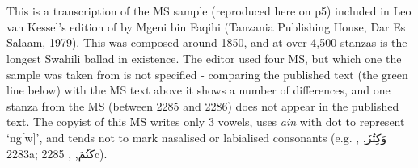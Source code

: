 \documentclass[a4paper, 12pt]{report}
\begin{document}
\begin{center}
 \\
 \\
\vspace{8mm}
\end{center}

\begin{small}
This is a transcription of the MS sample (reproduced here on p5) included in Leo van Kessel's edition of  by Mgeni bin Faqihi (Tanzania Publishing House, Dar Es Salaam, 1979).  This was composed around 1850, and at over 4,500 stanzas is the longest Swahili ballad in existence.  The editor used four MS, but which one the sample was taken from is not specified - comparing the published text (the green line below) with the MS text above it shows a number of differences, and one stanza from the MS (between 2285 and 2286) does not appear in the published text.  The copyist of this MS writes only 3 vowels, uses \textit{ain} with dot to represent `ng[w]', and tends not to mark nasalised or labialised consonants (e.g.  \textarabic{وَكِتُزَ}, , 2283a; \textarabic{كَتُمَ}, , 2285c).
\end{small}
\vspace{8mm}
\end{document}
